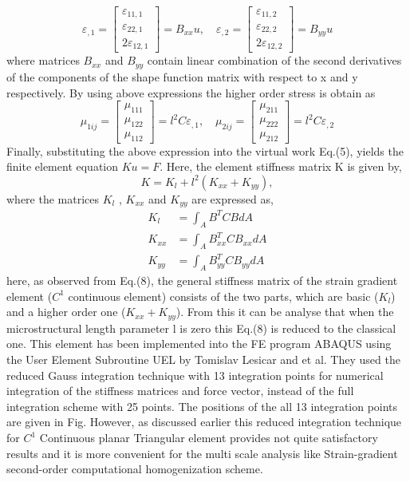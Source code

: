 \documentclass[12pt]{article}
\begin{document}
\[
\varepsilon_{,1}=
\begin{bmatrix}
\varepsilon_{11,1} \\
\varepsilon_{22,1} \\
2\varepsilon_{12,1} 
\end{bmatrix}
=B_{xx}u , \quad   
\varepsilon_{,2}=
\begin{bmatrix}
\varepsilon_{11,2} \\
\varepsilon_{22,2} \\
2\varepsilon_{12,2}
\end{bmatrix}
=B_{yy}u
\]
\newline
where matrices $ B_{xx} $ and $ B_{yy} $ contain linear combination of the second derivatives of the components of the shape function matrix with respect to x and y respectively. By using above expressions the higher order stress is obtain as
\[
\mu_{1ij}=
\begin{bmatrix}
\mu_{111} \\
\mu_{122} \\
\mu_{112} 
\end{bmatrix}
=l^2C\varepsilon_{,1} , \quad   
\mu_{2ij}=
\begin{bmatrix}
\mu_{211} \\
\mu_{222} \\
\mu_{212} 
\end{bmatrix}
=l^2C\varepsilon_{,2}
\]
\newline
Finally, substituting the above expression into the virtual work Eq.(5), yields the finite element equation $Ku = F$. Here, the element stiffness matrix K is given by,
\begin{equation}
K = K_l + l^2(K_{xx}+K_{yy}),
\end{equation}  
where the matrices $ K_l $ , $ K_{xx} $ and $ K_{yy} $ are expressed as,
\begin{equation}
\begin{aligned}
K_l &= \int_A B^TCBdA \\
K_{xx} &= \int_A B^T_{xx}CB_{xx}dA \\
K_{yy} &= \int_A B^T_{yy}CB_{yy}dA 
\end{aligned}
\end{equation}
here, as observed from Eq.(8), the general stiffness matrix of the strain gradient element ($C^1$ continuous element) consists of the two parts, which are basic ($K_l$) and a higher order one ($K_{xx}+K_{yy}$). From this it can be analyse that when the microstructural length parameter l is zero this Eq.(8) is reduced to the classical one.
\newline
\newline
This element has been implemented into the FE program ABAQUS using the User Element Subroutine UEL by Tomislav Lesicar and et al. They used the reduced Gauss integration
technique with 13 integration points for numerical integration of the stiffness matrices and force vector, instead of the full integration scheme with 25 points. The positions of the all 13 integration points are given in Fig. However, as discussed earlier this reduced integration technique for $C^1$ Continuous planar Triangular element provides not quite satisfactory results and it is more convenient for the multi scale analysis like Strain-gradient second-order computational homogenization scheme.     
\end{document}
